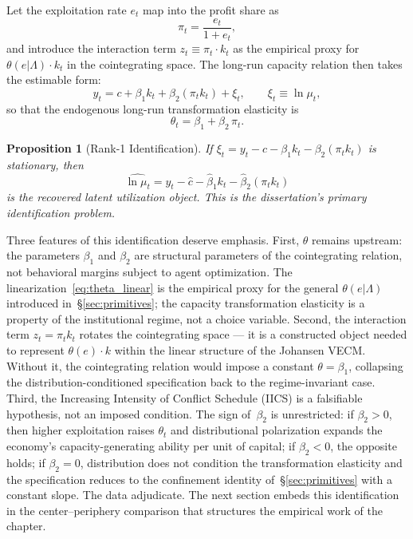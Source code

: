 \documentclass[12pt,letterpaper]{article}
\newcommand{\mut}{\mu_t}           %
\newcommand{\pit}{\pi_t}           %
\newtheorem{proposition}{Proposition}[section]
\begin{document}
Let the exploitation rate $e_t$ map into the profit share as
\begin{equation}
  \pit = \frac{e_t}{1 + e_t},
  \label{eq:profitshare}
\end{equation}
and introduce the interaction term $z_t \equiv \pit \cdot k_t$ as the
empirical proxy for $\theta(e|\Lambda)\cdot k_t$ in the cointegrating space.
The long-run capacity relation then takes the estimable form:
\begin{equation}
  y_t = c + \beta_1 k_t + \beta_2(\pit k_t) + \xi_t,
  \qquad
  \xi_t \equiv \ln\mut,
  \label{eq:cv}
\end{equation}
so that the endogenous long-run transformation elasticity is
\begin{equation}
  \theta_t = \beta_1 + \beta_2\, \pit.
  \label{eq:theta_linear}
\end{equation}

\begin{proposition}[Rank-1 Identification]
\label{prop:rank1}
If $\xi_t = y_t - c - \beta_1 k_t - \beta_2(\pit k_t)$ is stationary, then
\begin{equation}
  \widehat{\ln\mut} = y_t - \hat{c} - \hat{\beta}_1 k_t - \hat{\beta}_2(\pit k_t)
  \label{eq:cv_estimated}
\end{equation}
is the recovered latent utilization object. This is the dissertation's
primary identification problem.
\end{proposition}

Three features of this identification deserve emphasis. First, $\theta$ remains
upstream: the parameters $\beta_1$ and $\beta_2$ are structural parameters of
the cointegrating relation, not behavioral margins subject to agent
optimization. The linearization~\eqref{eq:theta_linear} is the empirical proxy
for the general $\theta(e|\Lambda)$ introduced
in~\S\ref{sec:primitives}; the capacity transformation elasticity is a
property of the institutional regime, not a choice variable. Second, the
interaction term $z_t = \pit k_t$ rotates the cointegrating space --- it is a
constructed object needed to represent $\theta(e)\cdot k$ within the linear
structure of the Johansen VECM. Without it, the cointegrating relation would
impose a constant $\theta = \beta_1$, collapsing the distribution-conditioned
specification back to the regime-invariant case. Third, the Increasing
Intensity of Conflict Schedule (IICS) is a falsifiable hypothesis, not an
imposed condition. The sign of~$\beta_2$ is unrestricted: if $\beta_2 > 0$,
then higher exploitation raises $\theta_t$ and distributional polarization
expands the economy's capacity-generating ability per unit of capital; if
$\beta_2 < 0$, the opposite holds; if $\beta_2 = 0$, distribution does not
condition the transformation elasticity and the specification reduces to the
confinement identity of~\S\ref{sec:primitives} with a constant slope. The data
adjudicate. The next section embeds this identification in the
center--periphery comparison that structures the empirical work of the chapter.
\end{document}
